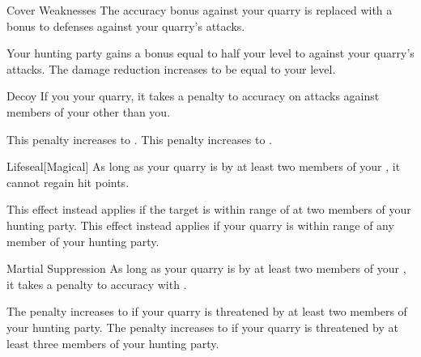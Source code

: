 {            \begin{freeability}{Cover Weaknesses}
                The accuracy bonus against your quarry is replaced with a  bonus to defenses against your quarry's attacks.

                \rankline
                 Your hunting party gains a bonus equal to half your level to  against your quarry's attacks.
                 The damage reduction increases to be equal to your level.
            \end{freeability}

            \begin{freeability}{Decoy}
                If you  your quarry, it takes a  penalty to accuracy on attacks against members of your  other than you.

                \rankline
                 This penalty increases to .
                 This penalty increases to .
            \end{freeability}

            \begin{freeability}{Lifeseal}[Magical]
                As long as your quarry is  by at least two members of your , it cannot regain hit points.

                \rankline
                 This effect instead applies if the target is within \rngmed range of at two members of your hunting party.
                 This effect instead applies if your quarry is within \rnglong range of any member of your hunting party.
            \end{freeability}

            \begin{freeability}{Martial Suppression}
                As long as your quarry is  by at least two members of your , it takes a  penalty to accuracy with .

                \rankline
                 The penalty increases to  if your quarry is threatened by at least two members of your hunting party.
                 The penalty increases to  if your quarry is threatened by at least three members of your hunting party.
            \end{freeability}

}
